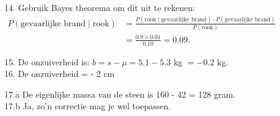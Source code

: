 14. Gebruik Bayes theorema om dit uit te rekenen:\\
$\begin{aligned}
    \displaystyle 
      P(\text{gevaarlijke brand} \mid \text{rook}) 
      & = \frac{P(\text{rook} \mid \text{gevaarlijke brand})\cdot P(\text{gevaarlijke brand})}{P(\text{rook})} \\
      & = \frac{0.9 \times 0.01}{0.10} = 0.09.
\end{aligned}$


15. De onzuiverheid is: $b = s - \mu = 5.1 - 5.3$ kg $= -0.2$ kg. \\


16. De onzuiverheid  = - 2 cm


17.a De eigenlijke massa van de steen is 160 - 42 = 128 gram.\\
17.b Ja, zo'n correctie mag je wel toepassen.

